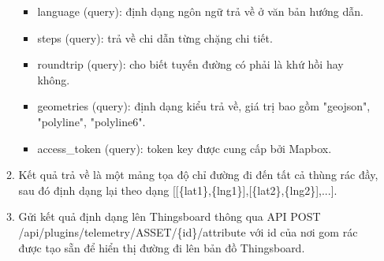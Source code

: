 \begin{itemize}
\begin{enumerate}
\begin{itemize}
            \item language (query): định dạng ngôn ngữ trả về ở văn bản hướng dẫn.
            \item steps (query): trả về chi dẫn từng chặng chi tiết.
            \item roundtrip (query): cho biết tuyến đường có phải là khứ hồi hay không.
            \item geometries (query): định dạng kiểu trả về, giá trị bao gồm "geojson", "polyline", "polyline6".
            \item access{\_}token (query): token key được cung cấp bởi Mapbox.
        \end{itemize}
        \item Kết quả trả về là một mảng tọa độ chỉ đường đi đến tất cả thùng rác đầy, sau đó định dạng lại theo dạng [[\{lat1\},\{lng1\}],[\{lat2\},\{lng2\}],...].
        \item Gửi kết quả định dạng lên Thingsboard thông qua API POST /api/plugins\newline/telemetry/ASSET/\{id\}/attribute với id của nơi gom rác được tạo sẵn để hiển thị đường đi lên bản đồ Thingsboard.   
    \end{enumerate}
  

\end{itemize}
